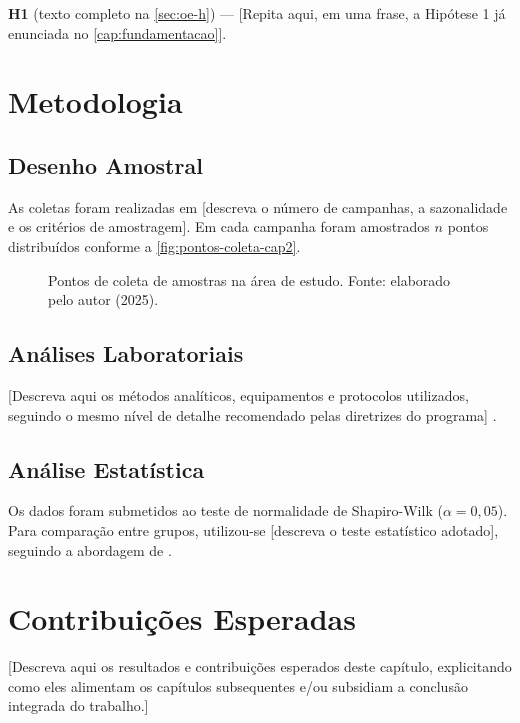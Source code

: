 \textbf{H1} (texto completo na \autoref{sec:oe-h}) — [Repita aqui, em
uma frase, a Hipótese 1 já enunciada no \autoref{cap:fundamentacao}].

\section{Metodologia}
\label{sec:cap2-metodologia}

\subsection{Desenho Amostral}

As coletas foram realizadas em [descreva o número de campanhas, a
sazonalidade e os critérios de amostragem]. Em cada campanha foram
amostrados $n$ pontos distribuídos conforme a
\autoref{fig:pontos-coleta-cap2}.

\begin{figure}[H]
  \centering
  \fbox{\rule{0pt}{6cm}\rule{12cm}{0pt}}
  \caption{Pontos de coleta de amostras na área de estudo. Fonte:
           elaborado pelo autor (2025).}
  \label{fig:pontos-coleta-cap2}
\end{figure}

\subsection{Análises Laboratoriais}

[Descreva aqui os métodos analíticos, equipamentos e protocolos
utilizados, seguindo o mesmo nível de detalhe recomendado pelas
diretrizes do programa] \cite{exemplo:relatorio:2021}.

\subsection{Análise Estatística}

Os dados foram submetidos ao teste de normalidade de Shapiro-Wilk
($\alpha = 0{,}05$). Para comparação entre grupos, utilizou-se
[descreva o teste estatístico adotado], seguindo a abordagem de
.

\section{Contribuições Esperadas}
\label{sec:cap2-contribuicoes}

[Descreva aqui os resultados e contribuições esperados deste
capítulo, explicitando como eles alimentam os capítulos
subsequentes e/ou subsidiam a conclusão integrada do trabalho.]
